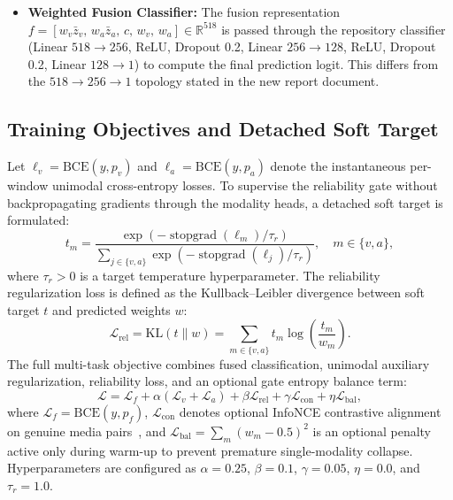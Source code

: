 \documentclass[conference]{IEEEtran}
\begin{document}
\begin{itemize}
    \item \textbf{Weighted Fusion Classifier:} The fusion representation $f = [w_v \bar{z}_v, \, w_a \bar{z}_a, \, c, \, w_v, \, w_a] \in \mathbb{R}^{518}$ is passed through the repository classifier (Linear $518\to256$, ReLU, Dropout 0.2, Linear $256\to128$, ReLU, Dropout 0.2, Linear $128\to1$) to compute the final prediction logit. This differs from the $518\to256\to1$ topology stated in the new report document.
\end{itemize}

\subsection{Training Objectives and Detached Soft Target}
Let $\ell_v = \mathrm{BCE}(y, p_v)$ and $\ell_a = \mathrm{BCE}(y, p_a)$ denote the instantaneous per-window unimodal cross-entropy losses. To supervise the reliability gate without backpropagating gradients through the modality heads, a detached soft target is formulated:
\begin{equation}
  t_m = \frac{\exp(-\operatorname{stopgrad}(\ell_m)/\tau_r)}{\sum_{j \in \{v, a\}} \exp(-\operatorname{stopgrad}(\ell_j)/\tau_r)}, \quad m \in \{v, a\},
  \label{eq:soft_target}
\end{equation}
where $\tau_r > 0$ is a target temperature hyperparameter. The reliability regularization loss is defined as the Kullback--Leibler divergence between soft target $t$ and predicted weights $w$:
\begin{equation}
  \mathcal{L}_{\mathrm{rel}} = \mathrm{KL}(t \parallel w) = \sum_{m \in \{v, a\}} t_m \log\left(\frac{t_m}{w_m}\right).
  \label{eq:l_rel}
\end{equation}
The full multi-task objective combines fused classification, unimodal auxiliary regularization, reliability loss, and an optional gate entropy balance term:
\begin{equation}
  \mathcal{L} = \mathcal{L}_f + \alpha(\mathcal{L}_v + \mathcal{L}_a) + \beta \mathcal{L}_{\mathrm{rel}} + \gamma \mathcal{L}_{\mathrm{con}} + \eta \mathcal{L}_{\mathrm{bal}},
  \label{eq:total_loss}
\end{equation}
where $\mathcal{L}_f = \mathrm{BCE}(y, p_f)$, $\mathcal{L}_{\mathrm{con}}$ denotes optional InfoNCE contrastive alignment on genuine media pairs~\cite{oord2018}, and $\mathcal{L}_{\mathrm{bal}} = \sum_m (w_m - 0.5)^2$ is an optional penalty active only during warm-up to prevent premature single-modality collapse. Hyperparameters are configured as $\alpha = 0.25$, $\beta = 0.1$, $\gamma = 0.05$, $\eta = 0.0$, and $\tau_r = 1.0$.
\end{document}
